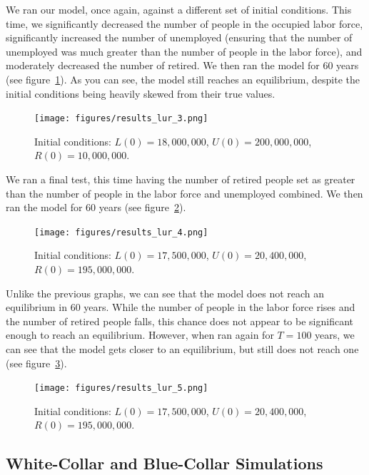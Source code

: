 \documentclass[11pt]{amsart}
\begin{document}
We ran our model, once again, against a different set of initial conditions. This time, we significantly decreased the number of people in the occupied
labor force, significantly increased the number of unemployed (ensuring that the number of unemployed was much greater than the number of people in the labor force), and moderately decreased the number of retired. We then ran the model for 60 years (see figure~\ref{fig:results_lur_3}).
As you can see, the model still reaches an equilibrium, despite the initial conditions being heavily skewed from their true values.

\begin{figure}[h]
    \centering
    \texttt{[image: figures/results\_lur\_3.png]}
    \caption{Initial conditions: $L(0) = 18,000,000$, $U(0) = 200,000,000$, $R(0) = 10,000,000$.}
    \label{fig:results_lur_3}
\end{figure}

We ran a final test, this time having the number of retired people set as greater than the number of
people in the labor force and unemployed combined. We then ran the model for 60 years (see figure~\ref{fig:results_lur_4}).

\begin{figure}[h]
    \centering
    \texttt{[image: figures/results\_lur\_4.png]}
    \caption{Initial conditions: $L(0) = 17,500,000$, $U(0) = 20,400,000$, $R(0) = 195,000,000$.}
    \label{fig:results_lur_4}
\end{figure}

Unlike the previous graphs, we can see that the model does not reach an equilibrium in 60 years. 
While the number of people in the labor force rises and the number of retired people falls, 
this chance does not appear to be significant enough to reach an equilibrium. However,
when ran again for $T = 100$ years, we can see that the model gets closer to an equilibrium, but 
still does not reach one (see figure~\ref{fig:results_lur_5}).

\begin{figure}[h]
    \centering
    \texttt{[image: figures/results\_lur\_5.png]}
    \caption{Initial conditions: $L(0) = 17,500,000$, $U(0) = 20,400,000$, $R(0) = 195,000,000$.}
    \label{fig:results_lur_5}
\end{figure}

\subsection{White-Collar and Blue-Collar Simulations}
\end{document}
